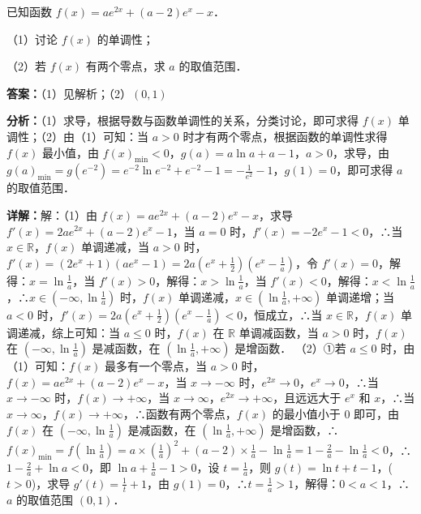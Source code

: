 \begin{question}[points=12]
已知函数 $f(x)=ae^{2x}+(a-2)e^x-x$．

（1）讨论 $f(x)$ 的单调性；

（2）若 $f(x)$ 有两个零点，求 $a$ 的取值范围．
\begin{solution}
\textbf{答案：}（1）见解析；（2）$(0,1)$

\textbf{分析：}（1）求导，根据导数与函数单调性的关系，分类讨论，即可求得 $f(x)$ 单调性；（2）由（1）可知：当 $a>0$ 时才有两个零点，根据函数的单调性求得 $f(x)$ 最小值，由 $f(x)_{\min}<0$，$g(a)=a\ln a+a-1$，$a>0$，求导，由 $g(a)_{\min}=g(e^{-2})=e^{-2}\ln e^{-2}+e^{-2}-1=-\frac{1}{e^2}-1$，$g(1)=0$，即可求得 $a$ 的取值范围．

\textbf{详解：}解：（1）由 $f(x)=ae^{2x}+(a-2)e^x-x$，求导 $f'(x)=2ae^{2x}+(a-2)e^x-1$，当 $a=0$ 时，$f'(x)=-2e^x-1<0$，∴当 $x\in\mathbb{R}$，$f(x)$ 单调递减，当 $a>0$ 时，$f'(x)=(2e^x+1)(ae^x-1)=2a(e^x+\frac{1}{2})(e^x-\frac{1}{a})$，令 $f'(x)=0$，解得：$x=\ln\frac{1}{a}$，当 $f'(x)>0$，解得：$x>\ln\frac{1}{a}$，当 $f'(x)<0$，解得：$x<\ln\frac{1}{a}$，∴$x\in(-\infty,\ln\frac{1}{a})$ 时，$f(x)$ 单调递减，$x\in(\ln\frac{1}{a},+\infty)$ 单调递增；当 $a<0$ 时，$f'(x)=2a(e^x+\frac{1}{2})(e^x-\frac{1}{a})<0$，恒成立，∴当 $x\in\mathbb{R}$，$f(x)$ 单调递减，综上可知：当 $a\leq0$ 时，$f(x)$ 在 $\mathbb{R}$ 单调减函数，当 $a>0$ 时，$f(x)$ 在 $(-\infty,\ln\frac{1}{a})$ 是减函数，在 $(\ln\frac{1}{a},+\infty)$ 是增函数．
（2）①若 $a\leq0$ 时，由（1）可知：$f(x)$ 最多有一个零点，当 $a>0$ 时，$f(x)=ae^{2x}+(a-2)e^x-x$，当 $x\to-\infty$ 时，$e^{2x}\to0$，$e^x\to0$，∴当 $x\to-\infty$ 时，$f(x)\to+\infty$，当 $x\to\infty$，$e^{2x}\to+\infty$，且远远大于 $e^x$ 和 $x$，∴当 $x\to\infty$，$f(x)\to+\infty$，∴函数有两个零点，$f(x)$ 的最小值小于 0 即可，由 $f(x)$ 在 $(-\infty,\ln\frac{1}{a})$ 是减函数，在 $(\ln\frac{1}{a},+\infty)$ 是增函数，∴$f(x)_{\min}=f(\ln\frac{1}{a})=a\times(\frac{1}{a})^2+(a-2)\times\frac{1}{a}-\ln\frac{1}{a}=1-\frac{2}{a}-\ln\frac{1}{a}<0$，∴$1-\frac{2}{a}+\ln a<0$，即 $\ln a+\frac{1}{a}-1>0$，设 $t=\frac{1}{a}$，则 $g(t)=\ln t+t-1$，($t>0$)，求导 $g'(t)=\frac{1}{t}+1$，由 $g(1)=0$，∴$t=\frac{1}{a}>1$，解得：$0<a<1$，∴$a$ 的取值范围 $(0,1)$．
\end{solution}
\end{question}

